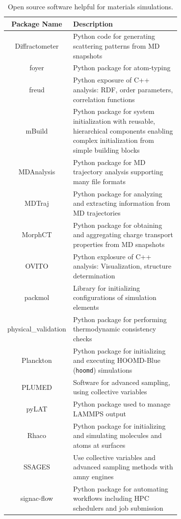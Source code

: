 \begin{table}
\caption{Open source software helpful for materials simulations.}
\centering
\begin{tabular}{|c|p{0.7\linewidth}|}
\hline
Package Name & Description  \\
\hline Diffractometer\cite{Jones2017, Diffract} & Python code for generating scattering patterns from MD snapshots  \\
\hline foyer\cite{Klein2018a} & Python package for atom-typing  \\
\hline freud\cite{Harper2016} & Python exposure of C++ analysis: RDF, order parameters, correlation functions   \\
\hline mBuild\cite{Klein2016} & Python package for system initialization with reusable, hierarchical components enabling complex initialization from simple building blocks \\
\hline MDAnalysis\cite{Gowers2016} & Python package for MD trajectory analysis supporting many file formats  \\
\hline MDTraj\cite{McGibbon2015} & Python package for analyzing and extracting information from MD trajectories  \\
\hline MorphCT\cite{Jones2017, MorphCT} & Python package for obtaining and aggregating charge transport properties from MD snapshots  \\
    \hline OVITO\cite{Stukowski2010} & Python explosure of C++ analysis: Visualization, structure determination \\
\hline packmol\cite{Martinez2009} & Library for initializing configurations of simulation elements\\
\hline physical\_validation\cite{Merz2018} & Python package for performing thermodynamic consistency checks \\ 
\hline Planckton\cite{planckton} & Python package for initializing and executing HOOMD-Blue (\texttt{hoomd}) simulations \\ 
\hline PLUMED\cite{Tribello2014} & Software for advanced sampling, using collective variables \\ 
\hline pyLAT\cite{Humbert2019} & Python package used to manage LAMMPS output \\
\hline Rhaco\cite{Rhaco} & Python package for initializing and simulating molecules and atoms at surfaces \\
\hline SSAGES\cite{Sidky2018} & Use collective variables and advanced sampling methods with amny engines \\
\hline signac-flow\cite{Adorf2018,signac_zenodo} & Python package for automating workflows including HPC schedulers and job submission \\

\end{tabular}
\end{table}
